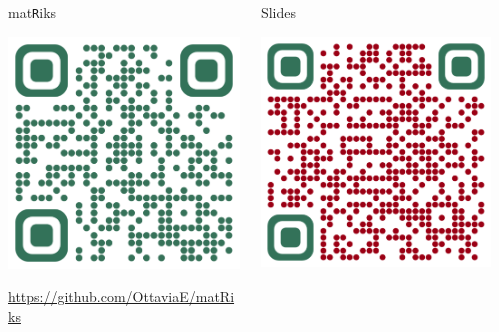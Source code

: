 \documentclass{beamer}
\begin{document}
\begin{frame}
	\begin{columns}[T]
		\begin{column}{.50\linewidth}
			
			\centering
			
			\large mat\texttt{R}iks
			
			\vspace{3mm}
			\includegraphics[width=.6\linewidth]{img/matriks.png}
			
			\footnotesize
			\href{https://github.com/OttaviaE/matRiks}{https://github.com/OttaviaE/matRiks}
		\end{column}
		
		\begin{column}{.50\linewidth}
			\centering
		Slides 
		
		\vspace{3mm}
		\includegraphics[width=.6\linewidth]{img/presentation.png}

		\end{column}
		\begin{column}{.50\linewidth}
			

\end{column}
\end{columns}
\end{frame}
\end{document}
